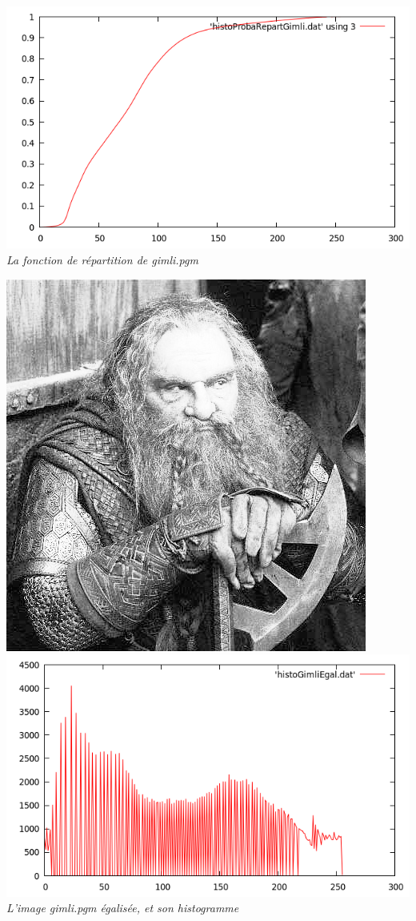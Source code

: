 \documentclass[a4paper,11pt]{article}
\begin{document}
\begin{center}
\includegraphics[scale=0.5]{fctionRepartGimliGris.png}\\
\textit{La fonction de répartition de gimli.pgm}
\end{center}
\newpage
\begin{center}
\includegraphics[scale=0.5]{gimliegal.png}
\includegraphics[scale=0.5]{histoGimliEgal.png}\\
\textit{L'image gimli.pgm égalisée, et son histogramme}
\end{center}
\end{document}
